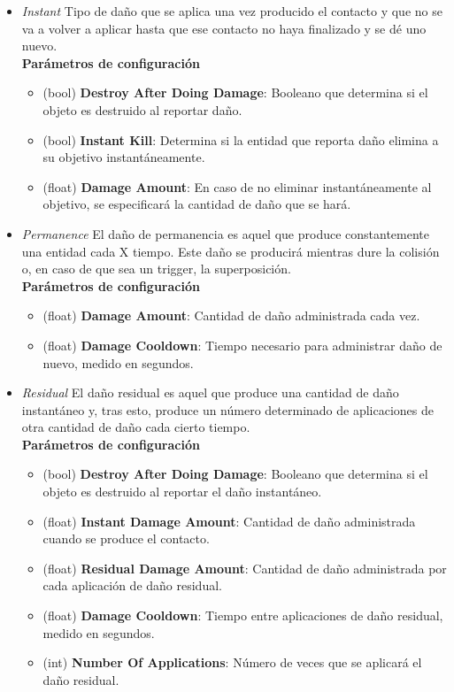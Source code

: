 \begin{itemize}
	\item \textit{Instant}
Tipo de daño que se aplica una vez producido el contacto y que no se va a volver a aplicar hasta que ese contacto no haya finalizado y se dé uno nuevo.\\

\textbf{Parámetros de configuración}
	\begin{itemize}
	        \item (bool) \textbf{Destroy After Doing Damage}: Booleano que determina si el objeto es destruido al reportar daño.
	        \item (bool) \textbf{Instant Kill}: Determina si la entidad que reporta daño elimina a su objetivo instantáneamente.
	        \item (float) \textbf{Damage Amount}: En caso de no eliminar instantáneamente al objetivo, se especificará la cantidad de daño que se hará.
	 \end{itemize}
	\item \textit{Permanence}
El daño de permanencia es aquel que produce constantemente una entidad cada X tiempo. Este daño se producirá mientras dure la colisión o, en caso de que sea un trigger, la superposición.\\

\textbf{Parámetros de configuración}
	\begin{itemize}
	        \item (float) \textbf{Damage Amount}: Cantidad de daño administrada cada vez.
	        \item (float) \textbf{Damage Cooldown}: Tiempo necesario para administrar daño de nuevo, medido en segundos.
	\end{itemize}

	\item \textit{Residual}
El daño residual es aquel que produce una cantidad de daño instantáneo y, tras esto, produce un número determinado de aplicaciones de otra cantidad de daño cada cierto tiempo.\\

\textbf{Parámetros de configuración}
	\begin{itemize}
	        \item (bool) \textbf{Destroy After Doing Damage}: Booleano que determina si el objeto es destruido al reportar el daño instantáneo.
	        \item (float) \textbf{Instant Damage Amount}: Cantidad de daño administrada cuando se produce el contacto.
	        \item (float) \textbf{Residual Damage Amount}: Cantidad de daño administrada por cada aplicación de daño residual.
	        \item (float) \textbf{Damage Cooldown}: Tiempo entre aplicaciones de daño residual, medido en segundos.
	        \item (int) \textbf{Number Of Applications}: Número de veces que se aplicará el daño residual.
	\end{itemize}
\end{itemize}
